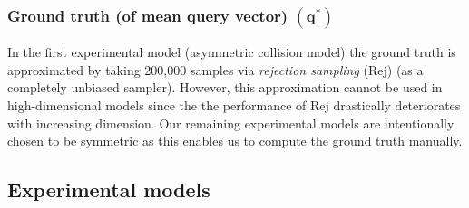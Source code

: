\documentclass[]{article}
\newcommand{\bvec}[1]{\textbf{#1}}
\begin{document}
\subsubsection*{Ground truth (of mean query vector) $(\bvec{q}^*)$}
In the first experimental model (asymmetric collision model)
the ground truth is approximated by taking 200,000 samples via \emph{rejection sampling} (Rej)
(as a completely unbiased sampler).
However, this approximation cannot be used in high-dimensional models
since the the performance of Rej drastically deteriorates with increasing dimension.
Our remaining experimental models are intentionally chosen to be symmetric
as this enables us to compute the ground truth manually.%


\subsection{Experimental models}
\label{sect:experimental.results.models}

\end{document}
